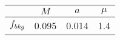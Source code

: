 \begin{tabular}{c||c|c|c}
 & $M$ & $a$ & $\mu$  \\
\hline
$f_{bkg}$  & 0.095 & 0.014 & 1.4\\
\end{tabular}

